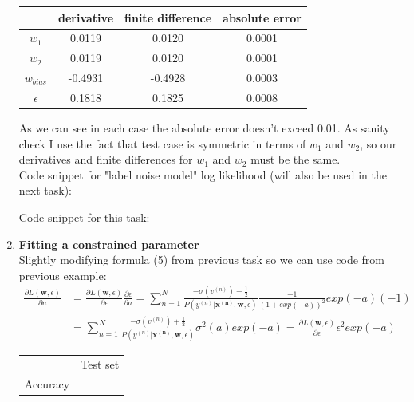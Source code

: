 \documentclass{article}
\newcommand{\vect}[1]{\boldsymbol{#1}} %
\begin{document}
\begin{enumerate}[label=(\alph*)]
\begin{center}
							\begin{tabular}{| c | c | c | c |}
								\hline
								\, & derivative & finite difference & absolute error \\
								\hline
								$w_{1}$ 	& 0.0119 & 0.0120 & 0.0001 \\
								\hline
								$w_{2}$     & 0.0119 & 0.0120 & 0.0001 \\
								\hline
							    $w_{bias}$ &-0.4931 &-0.4928& 0.0003 \\
							    \hline
							    $\epsilon$ & 0.1818 & 0.1825 & 0.0008 \\
							    \hline
							\end{tabular}
						\end{center}
						As we can see in each case the absolute error doesn't exceed 0.01. As sanity check I use the fact that test case is symmetric in terms of $w_{1}$ and $w_{2}$, so our derivatives and finite differences for $w_{1}$ and $w_{2}$ must be the same.\\
						Code snippet for "label noise model" log likelihood (will also be used in the next task):
						
						Code snippet for this task:
						
						
					\item
						\textbf{Fitting a constrained parameter}\\
						Slightly modifying formula (5) from previous task so we can use code from previous example:
						\begin{align*}
						\frac{\partial L(\vect{w}, \epsilon)}{\partial a} &=
						\frac{\partial L(\vect{w}, \epsilon)}{\partial \epsilon} 
						\frac{\partial \epsilon}{\partial a} =
						\sum_{n=1}^{N} 
							\frac 
								{-\sigma(v^{(n)}) + \frac{1}{2}} 
								{P(y^{(n)}|\vect{x^{(n)}}, \vect{w}, \epsilon)}		
							\frac{-1} {(1 + exp(-a))^2} exp(-a) (-1) 
						\\
						&=\sum_{n=1}^{N} 
								\frac 
									{-\sigma(v^{(n)}) + \frac{1}{2}} 
									{P(y^{(n)}|\vect{x^{(n)}}, \vect{w}, \epsilon)}		
							\sigma^2(a)	exp(-a)		=
							\frac{\partial L(\vect{w}, \epsilon)}{\partial \epsilon} 
							\epsilon^2 exp(-a)					
						\end{align*}
						\begin{center}
							\begin{tabular}{| c | c |}
								\hline
								\, & Test set 
								\\
								Accuracy & 
							\end{tabular}
						\end{center}

				\end{enumerate}
				
				
\end{document}
